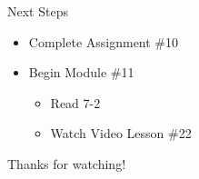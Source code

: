 \documentclass[t, aspectratio=169]{beamer}
\newcommand{\?}{\stackrel{?}{=}}
\begin{document}
	\begin{frame}{Next Steps}
		\begin{itemize}
			\item Complete Assignment \#10
			\item Begin Module \#11 \begin{itemize}
				\item Read 7-2
				\item Watch Video Lesson \#22
			\end{itemize}
		\end{itemize}
	
		\vfill
		
		Thanks for watching!
	\end{frame}
	
\end{document}
